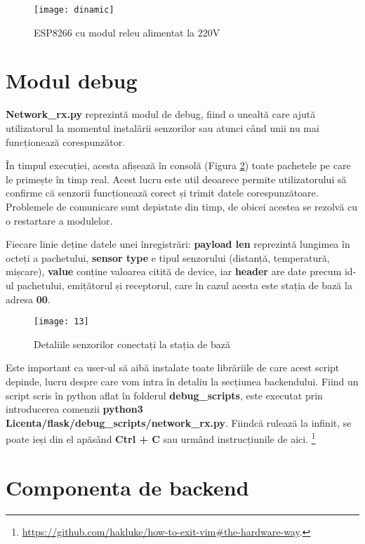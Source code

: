 \begin{figure}[h]
	\centering
	\texttt{[image: dinamic]}
	\caption{ESP8266 cu modul releu alimentat la 220V}
	\label{fig:dinamic}
\end{figure}

\section{Modul debug}

\textbf{Network\_rx.py} reprezintă modul de debug, fiind o unealtă care ajută utilizatorul la momentul instalării senzorilor sau atunci când unii nu mai funcționează corespunzător.

În timpul execuției, acesta afișează în consolă (Figura \ref{fig:13}) toate pachetele pe care le primește în timp real. Acest lucru este util deoarece permite utilizatorului să confirme că senzorii funcționează corect și trimit datele corespunzătoare. Problemele de comunicare sunt depistate din timp, de obicei acestea se rezolvă cu o restartare a modulelor.

Fiecare linie deține datele unei înregistrări: \textbf{payload len} reprezintă lungimea în octeți a pachetului, \textbf{sensor type} e tipul senzorului (distanță, temperatură, mișcare), \textbf{value} conține valoarea citită de device, iar \textbf{header} are date precum id-ul pachetului, emițătorul și receptorul, care în cazul acesta este stația de bază la adresa \textbf{00}.

\begin{figure}[h]
	\centering
	\texttt{[image: 13]}
	\caption{Detaliile senzorilor conectați la stația de bază}
	\label{fig:13}
\end{figure}

Este important ca user-ul să aibă instalate toate librăriile de care acest script depinde, lucru despre care vom intra în detaliu la secțiunea backendului. Fiind un script scris în python aflat în folderul \textbf{debug\_scripts}, este executat prin introducerea comenzii \textbf{python3 Licenta/flask/debug\_scripts/network\_rx.py}. Fiindcă rulează la infinit, se poate ieși din el apăsând \textbf{Ctrl + C} sau urmând instrucțiunile de aici. \footnote{\url{https://github.com/hakluke/how-to-exit-vim\#the-hardware-way}.}

\newpage

\section{Componenta de backend}

